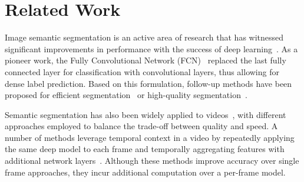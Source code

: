 \documentclass[10pt,twocolumn,letterpaper]{article}
\begin{document}
  













































%
 \section{Related Work}
 Image semantic segmentation is an active area of research that has witnessed significant improvements in performance with the success of deep learning~\cite{liu2019auto,huang2017densely,he2016deep,simonyan2014very}.  
 As a pioneer work, the Fully Convolutional Network (FCN)~\cite{long2015fully} replaced the last fully connected layer for classification with convolutional layers, thus allowing for dense label prediction.
 Based on this formulation, follow-up methods have been proposed for efficient segmentation~\cite{paszke2016enet,zhao2018icnet,yu2018bisenet,li2019dfanet,orsic2019defense,Paul_2020_WACV} or high-quality segmentation~\cite{chen2018encoder,li2019attention,shuai2016dag,TangDPBS18,TangPDASB18,ding2018context,peng2017large,He_2019_ICCV,Takikawa_2019_ICCV,Nekrasov_2020_WACV}. 
 
Semantic segmentation has also been widely applied to videos~\cite{he2017std2p,mahasseni2017budget,tripathi2015semantic,kundu2016feature}, with different approaches employed to balance the trade-off between quality and speed. 
A number of methods leverage temporal context in a video by repeatedly applying the same deep model to each frame and temporally aggregating features with additional network layers~\cite{nilsson2018semantic,gadde2017semantic,jin2017video}. 
Although these methods improve accuracy over single frame approaches, they incur additional computation over a per-frame model.
 
\end{document}
